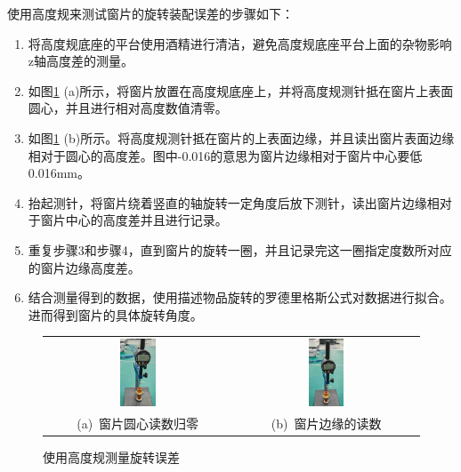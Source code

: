 \documentclass[master]{thesis-uestc}
\begin{document}
使用高度规来测试窗片的旋转装配误差的步骤如下：
\begin{enumerate}
    \item 将高度规底座的平台使用酒精进行清洁，避免高度规底座平台上面的杂物影响z轴高度差的测量。
    \item 如图\ref{fig:高度规测量旋转误差} (a)所示，将窗片放置在高度规底座上，并将高度规测针抵在窗片上表面圆心，并且进行相对高度数值清零。
    \item 如图\ref{fig:高度规测量旋转误差} (b)所示。将高度规测针抵在窗片的上表面边缘，并且读出窗片表面边缘相对于圆心的高度差。图中-0.016的意思为窗片边缘相对于窗片中心要低0.016mm。
    \item 抬起测针，将窗片绕着竖直的轴旋转一定角度后放下测针，读出窗片边缘相对于窗片中心的高度差并且进行记录。
    \item 重复步骤3和步骤4，直到窗片的旋转一圈，并且记录完这一圈指定度数所对应的窗片边缘高度差。
    \item 结合测量得到的数据，使用描述物品旋转的罗德里格斯公式对数据进行拟合。进而得到窗片的具体旋转角度。
\end{enumerate}
\begin{figure}[!htb]
    \small
    \centering
    \begin{tabular}{@{\ }c@{\ }c}
        \includegraphics[width=0.2\textwidth]{pic/chapter5/高度规窗片中心.jpg} &
        \hspace{5pt}
        \includegraphics[width=0.2\textwidth]{pic/chapter5/高度规窗片边缘.jpg}     \\
        \mbox{\small (a) 窗片圆心读数归零}                                                                               &
        \mbox{\small (b) 窗片边缘的读数}                                                                                  \\
    \end{tabular}
    \caption{使用高度规测量旋转误差}
    \label{fig:高度规测量旋转误差}
\end{figure}
\end{document}
